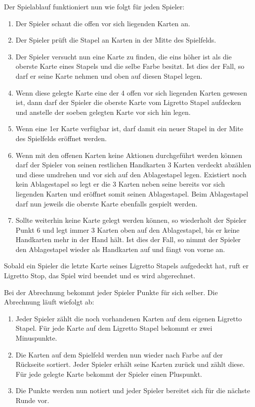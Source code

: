 Der Spielablauf funktioniert nun wie folgt für jeden Spieler:
\begin{enumerate}
\item Der Spieler schaut die offen vor sich liegenden Karten an.
\item Der Spieler prüft die Stapel an Karten in der Mitte des Spielfelds. 
\item Der Spieler versucht nun eine Karte zu finden, die eins höher ist als die oberste Karte eines Stapels und die selbe Farbe besitzt. Ist dies der Fall, so darf er seine Karte nehmen und oben auf diesen Stapel legen.
\item Wenn diese gelegte Karte eine der 4 offen vor sich liegenden Karten gewesen ist, dann darf der Spieler die oberste Karte vom Ligretto Stapel aufdecken und anstelle der soeben gelegten Karte vor sich hin legen.
\item Wenn eine 1er Karte verfügbar ist, darf damit ein neuer Stapel in der Mite des Spielfelds eröffnet werden.
\item Wenn mit den offenen Karten keine Aktionen durchgeführt werden können darf der Spieler von seinen restlichen Handkarten 3 Karten verdeckt abzählen und diese umdrehen und vor sich auf den Ablagestapel legen. Existiert noch kein Ablagestapel so legt er die 3 Karten neben seine bereits vor sich liegenden Karten und eröffnet somit seinen Ablagestapel. Beim Ablagestapel darf nun jeweils die oberste Karte ebenfalls gespielt werden.
\item Sollte weiterhin keine Karte gelegt werden können, so wiederholt der Spieler Punkt 6 und legt immer 3 Karten oben auf den Ablagestapel, bis er keine Handkarten mehr in der Hand hält. Ist dies der Fall, so nimmt der Spieler den Ablagestapel wieder als Handkarten auf und fängt von vorne an.
\end{enumerate}

Sobald ein Spieler die letzte Karte seines Ligretto Stapels aufgedeckt hat, ruft er Ligretto Stop, das Spiel wird beendet und es wird abgerechnet.

Bei der Abrechnung bekommt jeder Spieler Punkte für sich selber. Die Abrechnung läuft wiefolgt ab:


\begin{enumerate}
\item Jeder Spieler zählt die noch vorhandenen Karten auf dem eigenen Ligretto Stapel. Für jede Karte auf dem Ligretto Stapel bekommt er zwei Minuspunkte.
\item Die Karten auf dem Spielfeld werden nun wieder nach Farbe auf der Rückseite sortiert. Jeder Spieler erhält seine Karten zurück und zählt diese. Für jede gelegte Karte bekommt der Spieler einen Pluspunkt.
\item Die Punkte werden nun notiert und  jeder Spieler bereitet sich für die nächste Runde vor.
\end{enumerate}